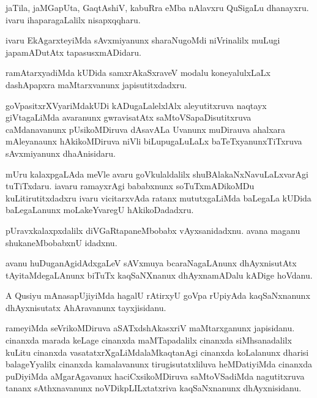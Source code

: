 \documentclass{article}
\begin{document}
\begin{mn}%
jaTila, jaMGapUta, GaqtAshiV, kabuRra eMba nAlavxru QuSigaLu dhanayxru. ivaru 
ihaparagaLalilx nisapxqqharu.
\end{mn}

\begin{mn}%
ivaru EkAgarxteyiMda sAvxmiyanunx sharaNugoMdi niVrinalilx muLugi japamADutAtx 
tapasusxmADidaru.
\end{mn}

\begin{mn}%
ramAtarxyadiMda kUDida samxrAkaSxraveV modalu koneyalulxLaLx dashApapxra maMtarxvanunx 
japisutitxdadxru.
\end{mn}

\begin{mn}%
goVpasitxrXVyariMdakUDi kADugaLalelxlAlx aleyutitxruva naqtayx giVtagaLiMda avaranunx 
gwravisatAtx saMtoVSapaDisutitxruva caMdanavanunx pUsikoMDiruva dAsavALa Uvanunx 
muDirauva ahalxara mAleyanaunx hAkikoMDiruva niVli biLupugaLuLaLx baTeTxyanunxTiTxruva 
sAvxmiyanunx dhaAnisidaru.
\end{mn}

\begin{mn}%
mUru kalaxpgaLAda meVle avaru goVkulaldalilx shuBAlakaNxNavuLaLxvarAgi tuTiTxdaru. iavaru 
ramayxrAgi bababxnunx soTuTxmADikoMDu kuLitirutitxdadxru ivaru vicitarxvAda ratanx 
mututxgaLiMda baLegaLa kUDida baLegaLanunx moLakeYvaregU hAkikoDadadxru.
\end{mn}

\begin{mn}%
pUravxkalaxpxdalilx diVGaRtapaneMbobabx vAyxsanidadxnu. avana maganu shukaneMbobabxnU 
idadxnu.
\end{mn}

\begin{mn}%
avanu huDuganAgidAdxgaLeV sAVxmuya bcaraNagaLAnunx dhAyxnisutAtx tAyitaMdegaLAnunx biTuTx 
kaqSaNXnanux dhAyxnamADalu kADige hoVdanu.
\end{mn}

\begin{mn}%
A Qusiyu mAnasapUjiyiMda hagalU rAtirxyU goVpa rUpiyAda kaqSaNxnanunx dhAyxnisutatx 
AhAravanunx tayxjisidanu.
\end{mn}

\begin{mn}%
rameyiMda seVrikoMDiruva aSATxdshAkasxriV maMtarxganunx japisidanu. cinanxda marada keLage 
cinanxda maMTapadalilx cinanxda siMhsanadalilx kuLitu cinanxda 
vasatatxrXgaLiMdalaMkaqtanAgi cinanxda koLalanunx dharisi balageYyalilx cinanxda 
kamalavanunx tirugisutatxliluva heMDatiyiMda cinanxda puDiyiMda aMgarAgavanux 
haciCxsikoMDiruva saMtoVSadiMda nagutitxruva tananx sAthxnavanunx noVDikpLILxtatxriva 
kaqSaNxnanunx dhAyxnisidanu.
\end{mn}
\end{document}

